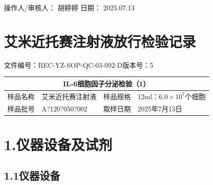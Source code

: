 \documentclass[UTF8,10pt,a4paper,fontset=fandol]{ctexart}
\newcommand{\fieldvalue}[1]{#1}
\newcommand{\handwritten}[1]{#1}
\begin{document}
\vfill

\noindent
操作人/审核人：
\fieldvalue{\handwritten{胡婷婷}}
\hfill
日期：
\fieldvalue{\handwritten{2025.07.13}}

\newpage

\section*{艾米近托赛注射液放行检验记录}

\begin{center}
文件编号：REC-YZ-SOP-QC-03-092-{}D\qquad 版本号：5
\end{center}

\begin{center}
\begin{tabular}{|p{3cm}|p{5cm}|p{3cm}|p{5cm}|}
\hline
\multicolumn{4}{|c|}{\textbf{IL-6细胞因子分泌检验（1）}}\\
\hline
样品名称 &
\fieldvalue{艾米近托赛注射液} &
样品规格 &
\fieldvalue{12ml：$6.0\times10^{7}$个细胞}\\
\hline
样品批号 &
\fieldvalue{\handwritten{A?120?050?002}} &
取样日期 &
\fieldvalue{\handwritten{2025年7月13日}}\\
\hline
\end{tabular}
\end{center}

\section*{1.\quad 仪器设备及试剂}

\subsection*{1.1\quad 仪器设备}
\end{document}
